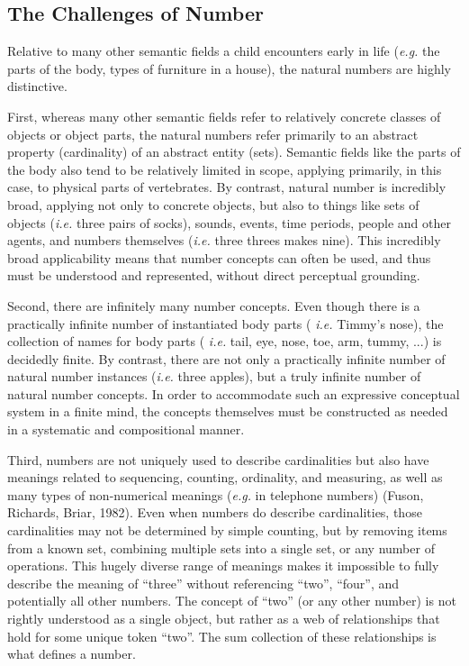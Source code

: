 \documentclass[10pt,letterpaper]{article}
\begin{document}
\subsection{The Challenges of Number}

Relative to many other semantic fields a child encounters early in
life ({\it e.g.} the parts of the body, types of furniture in a
house), the natural numbers are highly distinctive.

First, whereas many other semantic fields refer to relatively concrete
classes of objects or object parts, the natural numbers refer
primarily to an abstract property (cardinality) of an abstract entity
(sets). Semantic fields like the parts of the body also tend to be
relatively limited in scope, applying primarily, in this case, to
physical parts of vertebrates. By contrast, natural number is
incredibly broad, applying not only to concrete objects, but also to
things like sets of objects ({\it i.e.}  three pairs of socks),
sounds, events, time periods, people and other agents, and numbers
themselves ({\it i.e.}  three threes makes nine). This incredibly
broad applicability means that number concepts can often be used, and
thus must be understood and represented, without direct perceptual
grounding.

Second, there are infinitely many number concepts. Even though there
is a practically infinite number of instantiated body parts ({\it
  i.e.} Timmy's nose), the collection of names for body parts ({\it
  i.e.} tail, eye, nose, toe, arm, tummy, ...) is decidedly finite. By
contrast, there are not only a practically infinite number of natural
number instances ({\it i.e.}  three apples), but a truly infinite
number of natural number concepts. In order to accommodate such an
expressive conceptual system in a finite mind, the concepts themselves
must be constructed as needed in a systematic and compositional
manner.

Third, numbers are not uniquely used to describe cardinalities but
also have meanings related to sequencing, counting, ordinality, and
measuring, as well as many types of non-numerical meanings ({\it e.g.}
in telephone numbers) (Fuson, Richards, Briar, 1982). Even when
numbers do describe cardinalities, those cardinalities may not be
determined by simple counting, but by removing items from a known set,
combining multiple sets into a single set, or any number of
operations. This hugely diverse range of meanings makes it impossible
to fully describe the meaning of ``three'' without referencing
``two'', ``four'', and potentially all other numbers. The concept of
``two'' (or any other number) is not rightly understood as a single
object, but rather as a web of relationships that hold for some unique
token ``two''. The sum collection of these relationships is what
defines a number.
\end{document}
